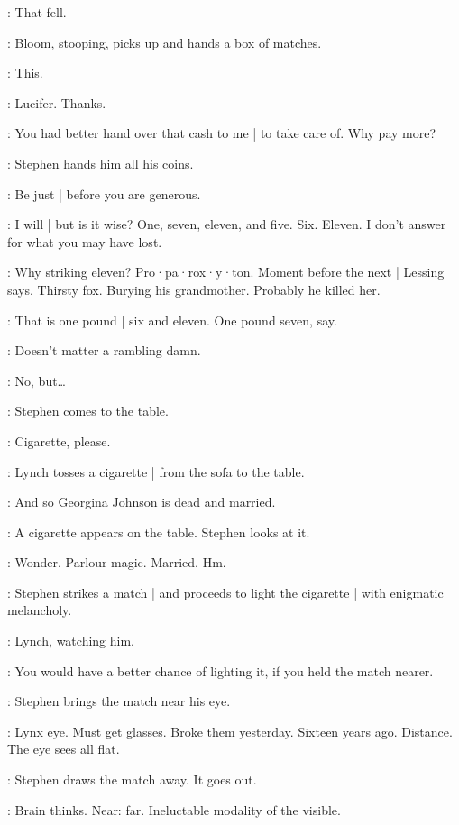 \Stephen:
That fell.

:
Bloom,
stooping,
picks up and hands a box of matches.

\Bloom:
This.

\Stephen:
Lucifer.
Thanks.

\Bloom:
You had better hand over that cash to me |
to take care of.
Why pay more?

:
Stephen hands him all his coins.

\Stephen:
Be just |
before you are generous.

\Bloom:
I will |
but is it wise?
One,
seven,
eleven,
and five.
Six.
Eleven.
I don't answer for what you may have lost.

\Stephen:
Why striking eleven?
Pro·pa·rox·y·ton.
Moment before the next |
Lessing says.
Thirsty fox.
Burying his grandmother.
Probably he killed her.

\Bloom:
That is one pound |
six and eleven.
One pound seven,
say.

\Stephen:
Doesn't matter a rambling damn.

\Bloom:
No,
but…

:
Stephen comes to the table.

\Stephen:
Cigarette,
please.

:
Lynch tosses a cigarette |
from the sofa to the table.

\Stephen:
And so Georgina Johnson is dead and married.

:
A cigarette appears on the table.
Stephen looks at it.

\Stephen:
Wonder.
Parlour magic.
Married.
Hm.

:
Stephen strikes a match |
and proceeds to light the cigarette |
with enigmatic melancholy.

:
Lynch,
watching him.

\Lynch:
You would have a better chance of lighting it,
if you held the match nearer.

:
Stephen brings the match near his eye.

\Stephen:
Lynx eye.
Must get glasses.
Broke them yesterday.
Sixteen years ago.
Distance.
The eye sees all flat.

:
Stephen draws the match away.
It goes out.

\Stephen:
Brain thinks.
Near:
far.
Ineluctable modality of the visible.

